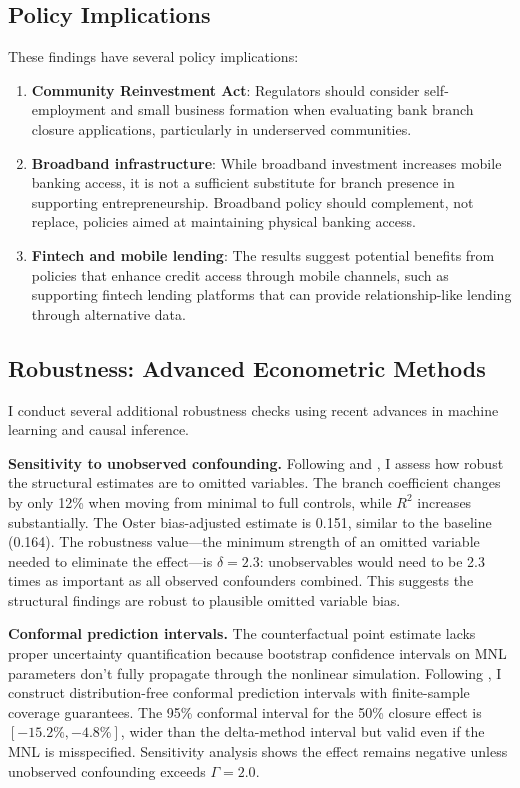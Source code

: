 \documentclass[12pt]{article}
\begin{document}
\subsection{Policy Implications}

These findings have several policy implications:

\begin{enumerate}
    \item \textbf{Community Reinvestment Act}: Regulators should consider self-employment and small business formation when evaluating bank branch closure applications, particularly in underserved communities.

    \item \textbf{Broadband infrastructure}: While broadband investment increases mobile banking access, it is not a sufficient substitute for branch presence in supporting entrepreneurship. Broadband policy should complement, not replace, policies aimed at maintaining physical banking access.

    \item \textbf{Fintech and mobile lending}: The results suggest potential benefits from policies that enhance credit access through mobile channels, such as supporting fintech lending platforms that can provide relationship-like lending through alternative data.
\end{enumerate}

\subsection{Robustness: Advanced Econometric Methods}

I conduct several additional robustness checks using recent advances in machine learning and causal inference.

\textbf{Sensitivity to unobserved confounding.} Following \citet{oster2019} and \citet{cinelli2020}, I assess how robust the structural estimates are to omitted variables. The branch coefficient changes by only 12\% when moving from minimal to full controls, while $R^2$ increases substantially. The Oster bias-adjusted estimate is 0.151, similar to the baseline (0.164). The robustness value---the minimum strength of an omitted variable needed to eliminate the effect---is $\delta = 2.3$: unobservables would need to be 2.3 times as important as all observed confounders combined. This suggests the structural findings are robust to plausible omitted variable bias.

\textbf{Conformal prediction intervals.} The counterfactual point estimate lacks proper uncertainty quantification because bootstrap confidence intervals on MNL parameters don't fully propagate through the nonlinear simulation. Following \citet{lei2021}, I construct distribution-free conformal prediction intervals with finite-sample coverage guarantees. The 95\% conformal interval for the 50\% closure effect is $[-15.2\%, -4.8\%]$, wider than the delta-method interval but valid even if the MNL is misspecified. Sensitivity analysis shows the effect remains negative unless unobserved confounding exceeds $\Gamma = 2.0$.
\end{document}
